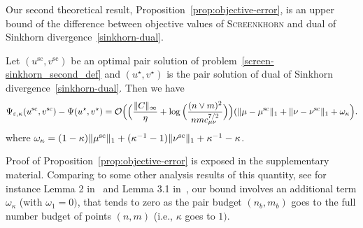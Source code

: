 Our second theoretical result, Proposition~\ref{prop:objective-error}, is an upper bound of the difference between objective values of \textsc{Screenkhorn} and dual of Sinkhorn divergence~\eqref{sinkhorn-dual}. 
\begin{proposition}
\label{prop:objective-error}
Let $(u^{\text{sc}}, v^{\text{sc}})$ be an optimal pair solution of problem~\eqref{screen-sinkhorn_second_def} and $(u^\star, v^\star)$ is the pair solution of dual of Sinkhorn divergence~\eqref{sinkhorn-dual}. Then we have 
\begin{align*}
\Psi_{\varepsilon, \kappa}(u^{\text{sc}} ,v^{\text{sc}}) -\Psi(u^\star, v^\star)
= \mathcal{O}\Big(\Big(\frac{\|C\|_\infty}{\eta} + \log\Big(\frac{(n\vee m)^2}{nmc_{\mu\nu}^{7/2}}\Big)\Big)(\|\mu - \mu^{\text{sc}}\|_1 + \|\nu - \nu^{\text{sc}}\|_1 + \omega_{\kappa}\Big).
\end{align*}
where $\omega_{\kappa} = (1- \kappa)\|\mu^{\text{sc}}\|_1 + (\kappa^{-1} - 1)\|\nu^{\text{sc}}\|_1 + \kappa^{-1} - \kappa$.
\end{proposition}
Proof of Proposition~\ref{prop:objective-error} is exposed in the supplementary material.
Comparing to some other analysis results of this quantity, see for instance Lemma 2 in~\cite{dvurechensky18aICML} and Lemma 3.1 in~\cite{lin2019}, our bound involves an additional term $\omega_{\kappa}$ (with $\omega_1 =0)$, that tends to zero as the pair budget $(n_b,m_b)$ goes to the full number budget of points $(n,m)$ (i.e., $\kappa$ goes to $1).$ 

